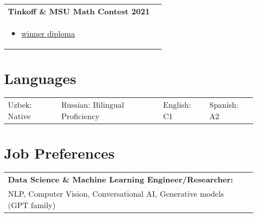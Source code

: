\documentclass[a4paper,8pt]{article}
\begin{document}
\begin{tabularx}{\linewidth}{ @{}l r@{} }
    \color[HTML]{1C033C} \textbf{Tinkoff \& MSU Math Contest 2021}\\[5pt]
    \begin{minipage}[t]{\linewidth}
        \begin{itemize}[nosep,after=\strut, leftmargin=2em, itemsep=2pt]
            \item \href{https://github.com/mumtozee/Documents/blob/main/tinkoff_winner_diploma.pdf}{winner diploma}
        \end{itemize}
    \end{minipage}
\end{tabularx}

\section{Languages}
\begin{tabularx}{\linewidth}{>{\centering}X >{\centering}X >{\centering}X >{\centering}X}
Uzbek: Native & Russian: Bilingual Proficiency & English: C1 & Spanish: A2
\end{tabularx}

\section{Job Preferences}
\begin{tabularx}{\linewidth}{ @{}l r@{} }
    \textbf{Data Science \& Machine Learning Engineer/Researcher:} \\[3pt]
    \hspace*{4ex} NLP, Computer Vision, Conversational AI, Generative models (GPT family)
\end{tabularx}
\end{document}
